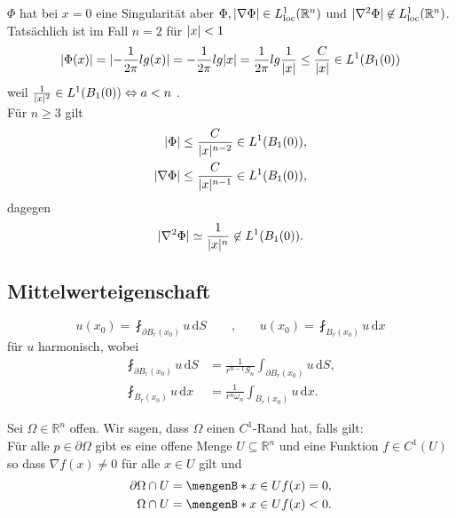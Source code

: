\begin{bemerkung}
	$\Phi$ hat bei $x=0$ eine Singularität aber $\Phi , \lvert \nabla \Phi\rvert \in L^1_{\text{loc}}(\mathbb{R}^n)$ und $ \lvert \nabla^2 \Phi\rvert \not\in L^1_{\text{loc}}(\mathbb{R}^n) $. Tatsächlich ist im Fall $n=2$ für $\lvert x\rvert < 1$
	\[
		\lvert \Phi (x)\rvert = \lvert - \frac{1}{2 \pi} lg(x)\rvert = - \frac{1}{2 \pi} lg \lvert x\rvert = \frac{1}{2 \pi} lg \frac{1}{\lvert x\rvert} \leq  \frac{C}{\lvert x\rvert} \in L^1(B_1(0)) 
	\]
	weil $ \frac{1}{\lvert x\rvert^2} \in L^1(B_1(0)) \Leftrightarrow a < n$ . \\
	Für $n \geq 3$ gilt
	\begin{align*}
		\lvert \Phi\rvert &\leq \frac{C}{\lvert x\rvert^{n-2}} \in L^1(B_1(0)), \\
		\lvert  \nabla  \Phi\rvert &\leq \frac{C}{\lvert x\rvert^{n-1}} \in  L^1 ( B_1(0)), 
	\end{align*}
	dagegen 
	\begin{equation}
		\lvert  \nabla^2 \Phi \rvert \simeq \frac{1}{\lvert x\rvert^n} \not\in L^1(B_1(0)).
	\end{equation}
\end{bemerkung}

\subsection{Mittelwerteigenschaft} 
\label{sub:mittelwerteigenschaft}
\begin{equation}
	u(x_0) = \fint_{\partial B_r(x_0)}^{} u \,\mathrm{d}S \qquad  \text{,} \qquad u(x_0) = \fint_{B_r(x_0)}^{} u \,\mathrm{d}x
\end{equation}
für $u$ harmonisch, wobei 
\begin{align*}
	\fint_{\partial B_r(x_0)}^{} u \,\mathrm{d}S &= \frac{1}{r^{n-1}S_n} \int_{\partial B_r(x_0)}^{}  u\,\mathrm{d}S, \\
	\fint_{B_r(x_0)}^{} u \,\mathrm{d}x &= \frac{1}{r^n \omega_n} \int_{B_r(x_0)}^{}u \,\mathrm{d}x.
\end{align*}

\begin{definition*}[$C^1$-Rand]
	Sei $\Omega \in \mathbb{R}^n$ offen. Wir sagen, dass $\Omega$ einen $C^1$-Rand hat, falls gilt: \\
	Für alle $p \in \partial \Omega$ gibt es eine offene Menge $U \subseteq \mathbb{R}^n$ und eine Funktion $f \in C^1(U)$ so dass $ \nabla f(x) \neq 0$ für alle $x \in U$ gilt und
	\begin{align*}
		\partial \Omega \cap U &= \set[x \in U]{f(x)=0}, \\
		\Omega \cap U &= \set[x \in U]{f(x) < 0}.
	\end{align*}
\end{definition*}

